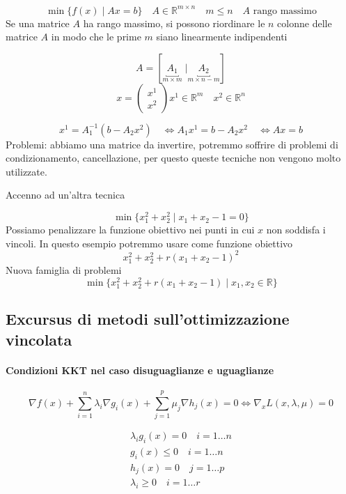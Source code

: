 \begin{example}
  $$ \min\{ f(x) \; | \; Ax = b  \}
\quad A \in \mathbb{R}^{m \times n} \quad m \leq n \quad
A \text{ rango massimo}
$$
Se una matrice $A$ ha rango massimo, si possono riordinare le $n$ colonne
delle matrice $A$ in modo che le prime $m$ siano linearmente indipendenti

$$ A = [ \underbracket{A_1}_{m \times m}  \; | \underbracket{A_2}_{m \times n-m} ]$$
$$x =
\begin{pmatrix}
x^{1} \\
x^{2}
\end{pmatrix}
x^{1} \in \mathbb{R}^{m} \quad x^{2} \in \mathbb{R}^{n}
$$

$$x^{1} = A_1^{-1}(b -A_2 x^{2})
\quad
\Longleftrightarrow
A_1 x^{1} = b -A_2 x^{2}
\quad
\Longleftrightarrow
Ax = b
$$
Problemi: abbiamo una matrice da invertire, potremmo soffrire
di problemi di condizionamento, cancellazione, per questo
queste tecniche non vengono molto utilizzate.

\end{example}
Accenno ad un'altra tecnica
\begin{example}
  $$ \min \{ x_1^{2} + x_2^{2} \; | \; x_1 + x_2 -1 = 0 \}$$
  Possiamo penalizzare la funzione obiettivo nei punti
  in cui $x$ non soddisfa i vincoli.
  In questo esempio potremmo usare come funzione obiettivo
$$ x_1^{2}  + x_2^{2} + r(x_1 + x_2 -1)^{2} $$
Nuova famiglia di problemi
$$
\min \{ x_1^{2} + x_2^{2} + r(x_1 + x_2 -1 ) \; | \; x_1, x_2 \in \mathbb{R} \}
$$
\end{example}


\subsection{Excursus di metodi sull'ottimizzazione vincolata}
\paragraph{Condizioni KKT nel caso disuguaglianze e uguaglianze}

$$
\nabla f(x) +
\displaystyle \sum_{i=1}^{n}
\lambda_i \nabla g_i(x) +
\displaystyle \sum_{j=1}^{p}
\mu_j \nabla h_j(x) = 0
\Longleftrightarrow
\nabla_x L(x, \lambda,\mu)=0
$$

$$
\begin{array}{l}
\lambda_i g_i(x) = 0 \quad i=1\ldots n \\
 g_i(x) \leq 0 \quad i=1\ldots n  \\
 h_j(x) = 0 \quad j=1 \ldots p  \\
 \lambda_i \geq 0 \quad i = 1 \ldots r
\end{array}
$$

